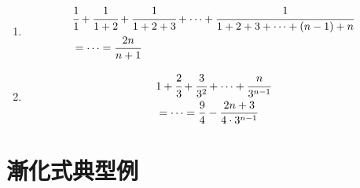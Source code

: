 \documentclass[autodetect-engine,ja=standard, 10.5pt, a4paper, titlepage]{bxjsarticle}
\begin{document}
\begin{enumerate}[1.]
  \item
          \begin{fleqn}[20pt]
            \begin{align*}
              &\cfrac{1}{1} + \cfrac{1}{1+2} + \cfrac{1}{1+2+3} + \cdots + \cfrac{1}{1+2+3+\cdots +(n-1)+n} \\
              &= \cdots = \frac{2n}{n+1}
            \end{align*}
          \end{fleqn}
  \item
          \begin{fleqn}[20pt]
            \begin{align*}
              &1+\cfrac{2}{3}+\cfrac{3}{3^2}+\cdots+\cfrac{n}{3^{n-1}} \\
              &= \cdots = \frac{9}{4} - \frac{2n+3}{4\cdot 3^{n-1}}
            \end{align*}
          \end{fleqn}
\end{enumerate}


\clearpage
\section*{漸化式\:\:典型例}
\end{document}
